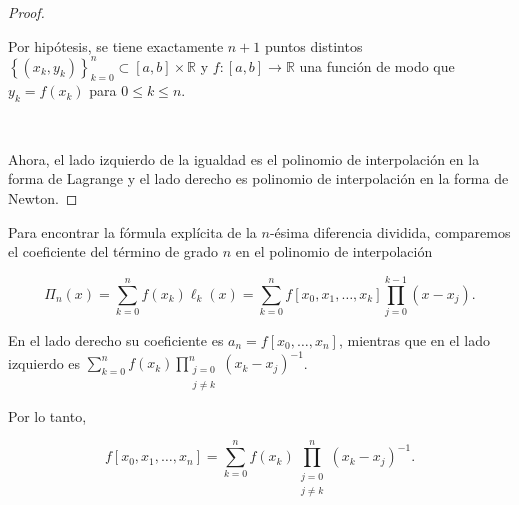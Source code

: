 \begin{frame}
\begin{proof}
		\

		Por hipótesis, se tiene exactamente $n+1$ puntos distintos
		\begin{math}
			{
				\left\{
				\left(x_{k},y_{k}\right)
				\right\}
			}_{k=0}^{n}\subset
			\left[a,b\right]\times\mathbb{R}
		\end{math}
		y
		\begin{math}
			f\colon\left[a,b\right]\to
			\mathbb{R}
		\end{math}
		una función de modo que
		\begin{math}
			y_{k}=
			f\left(x_{k}\right)
		\end{math}
		para $0\leq k\leq n$.

		\

		Ahora, el lado izquierdo de la igualdad es el polinomio de
		interpolación en la forma de \alert{Lagrange}
		y el lado derecho es polinomio de interpolación en la forma de
		\alert{Newton}.
	\end{proof}
\end{frame}

\begin{frame}
	\begin{solution}
		Para encontrar la fórmula explícita de la
		\alert{$n$-ésima diferencia dividida}, comparemos el coeficiente
		del término de grado $n$ en el polinomio de interpolación

		\begin{equation*}
			\Pi_{n}\left(x\right)=
			\sum\limits_{k=0}^{n}
			f\left(x_{k}\right)
			\ell_{k}\left(x\right)=
			\sum\limits_{k=0}^{n}
			f\left[x_{0},x_{1},\ldots,x_{k}\right]
			\prod\limits_{j=0}^{k-1}
			\left(x-x_{j}\right).
		\end{equation*}

		En el lado derecho su coeficiente es
		$a_{n}=f\left[x_{0},\ldots,x_{n}\right]$, mientras que en el lado
		izquierdo es
		\begin{math}
			\sum\limits_{k=0}^{n}
			f\left(x_{k}\right)
			\prod\limits_{\substack{j=0\\j\neq k}}^{n}
			{\left(x_{k}-x_{j}\right)}^{-1}
		\end{math}.

		Por lo tanto,

		\begin{equation*}
			f\left[x_{0},x_{1},\ldots,x_{n}\right]=
			\sum\limits_{k=0}^{n}
			f\left(x_{k}\right)
			\prod\limits_{\substack{j=0\\j\neq k}}^{n}
			{\left(x_{k}-x_{j}\right)}^{-1}.
		\end{equation*}
	\end{solution}
\end{frame}


